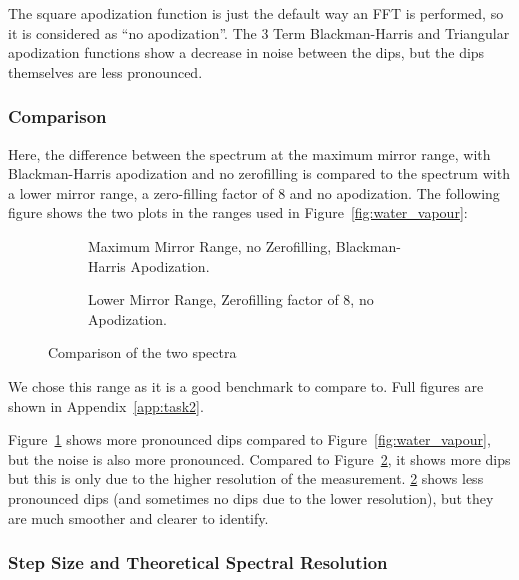 \documentclass{article}
\begin{document}
The square apodization function is just the default way an FFT is performed, so it is considered as ``no apodization''. The 3 Term Blackman-Harris and Triangular apodization functions show a decrease in noise between the dips, but the dips themselves are less pronounced. 



\subsubsection{Comparison}

Here, the difference between the spectrum at the maximum mirror range, with Blackman-Harris apodization and no zerofilling is compared to the spectrum with a lower mirror range, a zero-filling factor of 8 and no apodization. The following figure shows the two plots in the ranges used in Figure~\ref{fig:water_vapour}:

\begin{figure}[h!]
	\centering
	\begin{subfigure}[t]{0.48\textwidth}
		\centering
		\scalebox{0.5}{}
		\caption{Maximum Mirror Range, no Zerofilling, Blackman-Harris Apodization.}
		\label{fig:air32000Comparison}
	\end{subfigure} \hfill
	\begin{subfigure}[t]{0.48\textwidth}
		\centering
		\scalebox{0.5}{}
		\caption{Lower Mirror Range, Zerofilling factor of 8, no Apodization.}
		\label{fig:air8000Comparison}
	\end{subfigure}
	\caption{Comparison of the two spectra}
	\label{fig:comparison}
\end{figure}

We chose this range as it is a good benchmark to compare to. Full figures are shown in Appendix~\ref{app:task2}.

Figure~\ref{fig:air32000Comparison} shows more pronounced dips compared to Figure~\ref{fig:water_vapour}, but the noise is also more pronounced. Compared to Figure~\ref{fig:air8000Comparison}, it shows more dips but this is only due to the higher resolution of the measurement. \ref{fig:air8000Comparison} shows less pronounced dips (and sometimes no dips due to the lower resolution), but they are much smoother and clearer to identify.

\subsubsection{Step Size and Theoretical Spectral Resolution}
\end{document}
